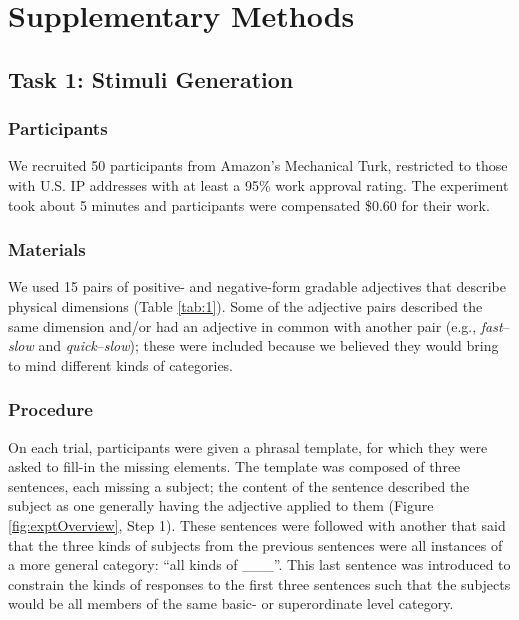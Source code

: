 \documentclass[doc]{apa6}
\begin{document}
\newpage







\newpage

\section{Supplementary Methods}

\subsection{Task 1: Stimuli Generation}

\subsubsection{Participants}

We recruited 50 participants from Amazon's Mechanical
Turk, restricted to those with U.S. IP addresses with at least a
95\% work approval rating. The experiment took about 5 minutes and
participants were compensated \$0.60 for their work.

\subsubsection{Materials}

We used 15 pairs of positive- and negative-form gradable adjectives that describe physical dimensions (Table \ref{tab:1}).
Some of the adjective pairs described the same dimension and/or had an adjective in common with another pair (e.g., \emph{fast}--\emph{slow} and \emph{quick}--\emph{slow}); these were included because we believed they would bring to mind different kinds of categories.

\subsubsection{Procedure}

On each trial, participants were given a phrasal template, for which they were asked to fill-in the missing elements.
The template was composed of three sentences, each missing a subject; the content of the sentence described the subject as one generally having the adjective applied to them (Figure \ref{fig:exptOverview}, Step 1).
These sentences were followed with another that said that the three kinds of subjects from the previous sentences were all instances of a more general category: ``all kinds of \_\_\_''.
This last sentence was introduced to constrain the kinds of responses to the first three sentences such that the subjects would be all members of the same basic- or superordinate level category.
\end{document}
